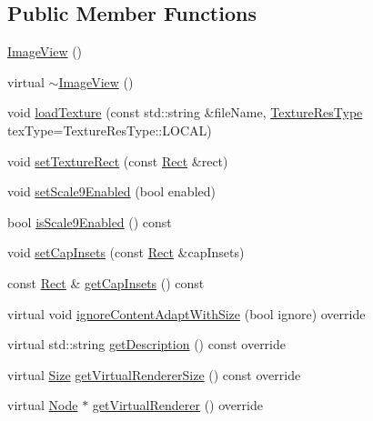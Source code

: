 \subsection*{Public Member Functions}
\begin{DoxyCompactItemize}
\item 
\hyperlink{classui_1_1ImageView_ab59faa92167986fd548f9f097a0990fd}{Image\+View} ()
\item 
virtual \hyperlink{classui_1_1ImageView_a02036dd4d7425aa1a36a4a547a2b83d8}{$\sim$\+Image\+View} ()
\item 
void \hyperlink{classui_1_1ImageView_a68ef2268cecbf1ccaf2efb05254e01c5}{load\+Texture} (const std\+::string \&file\+Name, \hyperlink{classui_1_1Widget_a040a65ec5ad3b11119b7e16b98bd9af0}{Texture\+Res\+Type} tex\+Type=Texture\+Res\+Type\+::\+L\+O\+C\+AL)
\item 
void \hyperlink{classui_1_1ImageView_a776968265a527b05e1d13797707e5e2c}{set\+Texture\+Rect} (const \hyperlink{classRect}{Rect} \&rect)
\item 
void \hyperlink{classui_1_1ImageView_a0bb86e839e826007cc92f362c0ae3794}{set\+Scale9\+Enabled} (bool enabled)
\item 
bool \hyperlink{classui_1_1ImageView_a773635821f82515c3fab2b1bf1715587}{is\+Scale9\+Enabled} () const
\item 
void \hyperlink{classui_1_1ImageView_aaca6b6106d235cadd64a19cf2255f218}{set\+Cap\+Insets} (const \hyperlink{classRect}{Rect} \&cap\+Insets)
\item 
const \hyperlink{classRect}{Rect} \& \hyperlink{classui_1_1ImageView_a9e86562ac6bad878494605b324dced2f}{get\+Cap\+Insets} () const
\item 
virtual void \hyperlink{classui_1_1ImageView_a0c1dbff2c1c5d14ac45f76d6daffadb5}{ignore\+Content\+Adapt\+With\+Size} (bool ignore) override
\item 
virtual std\+::string \hyperlink{classui_1_1ImageView_add3f735a7cee8c3192e9ee992446af12}{get\+Description} () const override
\item 
virtual \hyperlink{classSize}{Size} \hyperlink{classui_1_1ImageView_ae146b477fee678c08dfd0875aa0828df}{get\+Virtual\+Renderer\+Size} () const override
\item 
virtual \hyperlink{classNode}{Node} $\ast$ \hyperlink{classui_1_1ImageView_adffa0c091b7d528ffc50c7b117be61bc}{get\+Virtual\+Renderer} () override
\item 
\mbox{\label{classui_1_1ImageView_aa9250b87c85a7cde510526041e23d854}} 

\end{DoxyCompactItemize}
